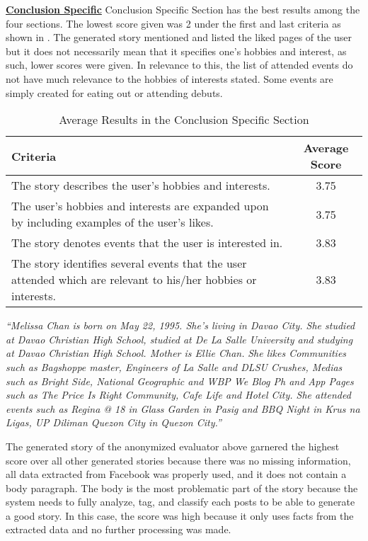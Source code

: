 \underline{\textbf{Conclusion Specific}}
Conclusion Specific Section has the best results among the four sections. The lowest score given was 2 under the first and last criteria as shown in . The generated story mentioned and listed the liked pages of the user but it does not necessarily mean that it specifies one’s hobbies and interest, as such, lower scores were given. In relevance to this, the list of attended events do not have much relevance to the hobbies of interests stated. Some events are simply created for eating out or attending debuts.

\begin{table}[ph!]   %
	\centering
	\caption{Average Results in the Conclusion Specific Section} \vspace{0.25em}
	\begin{tabular}{|p{2.5in}|c|} \hline
		\centering Criteria & Average Score \\ \hline
		The story describes the user’s hobbies and interests. & 3.75 \\ \hline
		The user’s hobbies and interests are expanded upon by including examples of the user’s likes. & 3.75 \\ \hline
		The story denotes events that the user is interested in. & 3.83 \\ \hline
		The story identifies several events that the user attended which are relevant to his/her hobbies or interests. & 3.83 \\ \hline
	\end{tabular}
	\label{tab:criteria4}
\end{table}

\textit{``Melissa Chan is born on May 22, 1995. She's living in Davao City. She studied at Davao Christian High School, studied at De La Salle University and studying at Davao Christian High School. Mother is Ellie Chan.}
 \newline
\textit{She likes Communities such as Bagshoppe master, Engineers of La Salle and DLSU Crushes, Medias such as Bright Side, National Geographic and WBP We Blog Ph and App Pages such as The Price Is Right Community, Cafe Life and Hotel City. She attended events such as Regina @ 18 in Glass Garden in Pasig and BBQ Night in Krus na Ligas, UP Diliman Quezon City in Quezon City.''}

The generated story of the anonymized evaluator above garnered the highest score over all other generated stories because there was no missing information, all data extracted from Facebook was properly used, and it does not contain a body paragraph. The body is the most problematic part of the story because the system needs to fully analyze, tag, and classify each posts to be able to generate a good story. In this case, the score was high because it only uses facts from the extracted data and no further processing was made. 

